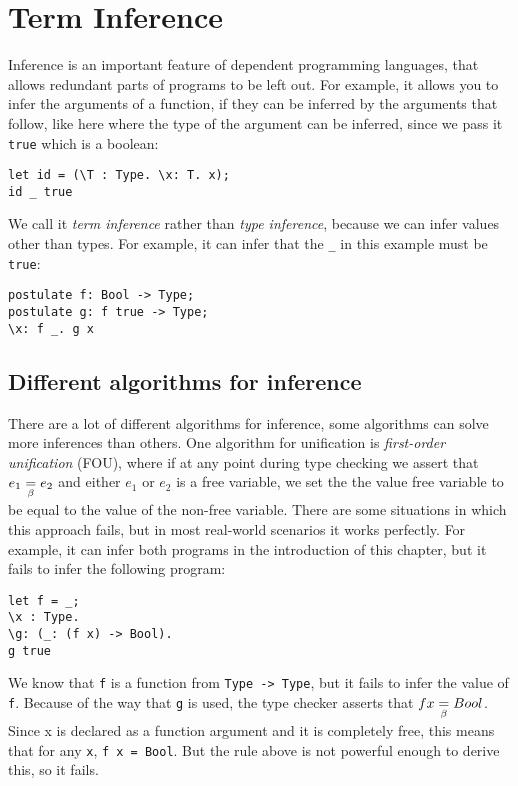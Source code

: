 \chapter{Term Inference}
\label{ch:inference}

Inference is an important feature of dependent programming languages, that allows redundant parts of programs to be left out. For example, it allows you to infer the arguments of a function, if they can be inferred by the arguments that follow, like here where the type of the argument can be inferred, since we pass it \verb|true| which is a boolean:
\begin{lstlisting}
let id = (\T : Type. \x: T. x);
id _ true
\end{lstlisting}

We call it \emph{term inference} rather than \emph{type inference}, because we can infer values other than types. For example, it can infer that the \verb|_| in this example must be \verb|true|:
\begin{lstlisting}
postulate f: Bool -> Type;
postulate g: f true -> Type;
\x: f _. g x
\end{lstlisting}

\section{Different algorithms for inference}
\label{strength-inference}

There are a lot of different algorithms for inference\cite{typeinference}, some algorithms can solve more inferences than others. One algorithm for unification is \emph{first-order unification} (FOU), where if at any point during type checking we assert that $e_1 \underset{\beta}{=} e_2$ and either $e_1$ or $e_2$ is a free variable, we set the the value free variable to be equal to the value of the non-free variable. There are some situations in which this approach fails, but in most real-world scenarios it works perfectly. For example, it can infer both programs in the introduction of this chapter, but it fails to infer the following program:

\begin{lstlisting}
let f = _;
\x : Type.
\g: (_: (f x) -> Bool).
g true
\end{lstlisting}

We know that \verb|f| is a function from \verb|Type -> Type|, but it fails to infer the value of \verb|f|. Because of the way that \verb|g| is used, the type checker asserts that $f x \underset{\beta}{=} Bool$. Since x is declared as a function argument and it is completely free, this means that for any \verb|x|, \verb|f x = Bool|. But the rule above is not powerful enough to derive this, so it fails.

